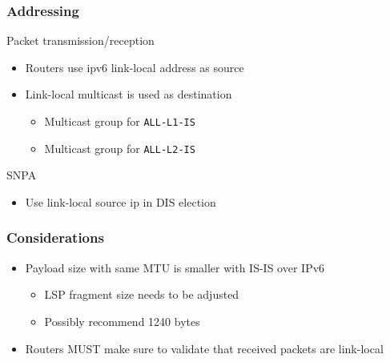 \documentclass[12pt]{beamer}
\begin{document}
\begin{frame}
  \frametitle{Addressing}
  \begin{block}{Packet transmission/reception}
    \begin{itemize}
      \item Routers use ipv6 link-local address as source
      \item Link-local multicast is used as destination
      \begin{itemize}
        \item Multicast group for \texttt{ALL-L1-IS}
        \item Multicast group for \texttt{ALL-L2-IS}
      \end{itemize}
    \end{itemize}
  \end{block}
  \begin{block}{SNPA}
    \begin{itemize}
      \item Use link-local source ip in DIS election
    \end{itemize}
  \end{block}
\end{frame}

\begin{frame}
  \frametitle{Considerations}
  \begin{itemize}
    \item Payload size with same MTU is smaller with IS-IS over IPv6
      \begin{itemize}
        \item LSP fragment size needs to be adjusted
        \item Possibly recommend 1240 bytes
      \end{itemize}
    \item Routers MUST make sure to validate that
          received packets are link-local
  \end{itemize}
\end{frame}
\end{document}
